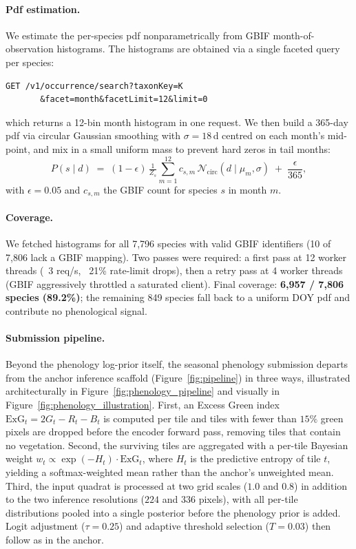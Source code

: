\documentclass[sigconf]{ceurart}
\begin{document}
\paragraph{Pdf estimation.} We estimate the per-species pdf nonparametrically from GBIF month-of-observation histograms. The histograms are obtained via a single faceted query per species:
\begin{verbatim}
GET /v1/occurrence/search?taxonKey=K
       &facet=month&facetLimit=12&limit=0
\end{verbatim}
which returns a 12-bin month histogram in one request. We then build a 365-day pdf via circular Gaussian smoothing with $\sigma = 18$\,d centred on each month's mid-point, and mix in a small uniform mass to prevent hard zeros in tail months:
\begin{equation}
    P(s \mid d) \;=\; (1{-}\epsilon)\, \tfrac{1}{Z_s}\!\sum_{m=1}^{12} c_{s,m}\,\mathcal{N}_{\text{circ}}\!\left(d \mid \mu_m, \sigma\right) \;+\; \frac{\epsilon}{365},
\end{equation}
with $\epsilon{=}0.05$ and $c_{s,m}$ the GBIF count for species $s$ in month $m$.
\paragraph{Coverage.} We fetched histograms for all 7{,}796 species with valid GBIF identifiers (10 of 7{,}806 lack a GBIF mapping). Two passes were required: a first pass at 12 worker threads (~3 req/s, ~21\% rate-limit drops), then a retry pass at 4 worker threads (GBIF aggressively throttled a saturated client). Final coverage: \textbf{6{,}957 / 7{,}806 species (89.2\%)}; the remaining 849 species fall back to a uniform DOY pdf and contribute no phenological signal.
\paragraph{Submission pipeline.} Beyond the phenology log-prior itself, the seasonal phenology submission departs from the anchor inference scaffold (Figure~\ref{fig:pipeline}) in three ways, illustrated architecturally in Figure~\ref{fig:phenology_pipeline} and visually in Figure~\ref{fig:phenology_illustration}. First, an Excess Green index $\mathrm{ExG}_t = 2G_t - R_t - B_t$ is computed per tile and tiles with fewer than $15\%$ green pixels are dropped before the encoder forward pass, removing tiles that contain no vegetation. Second, the surviving tiles are aggregated with a per-tile Bayesian weight $w_t \propto \exp(-H_t)\cdot\mathrm{ExG}_t$, where $H_t$ is the predictive entropy of tile $t$, yielding a softmax-weighted mean rather than the anchor's unweighted mean. Third, the input quadrat is processed at two grid scales ($1.0$ and $0.8$) in addition to the two inference resolutions ($224$ and $336$ pixels), with all per-tile distributions pooled into a single posterior before the phenology prior is added. Logit adjustment ($\tau{=}0.25$) and adaptive threshold selection ($T{=}0.03$) then follow as in the anchor.
\end{document}
